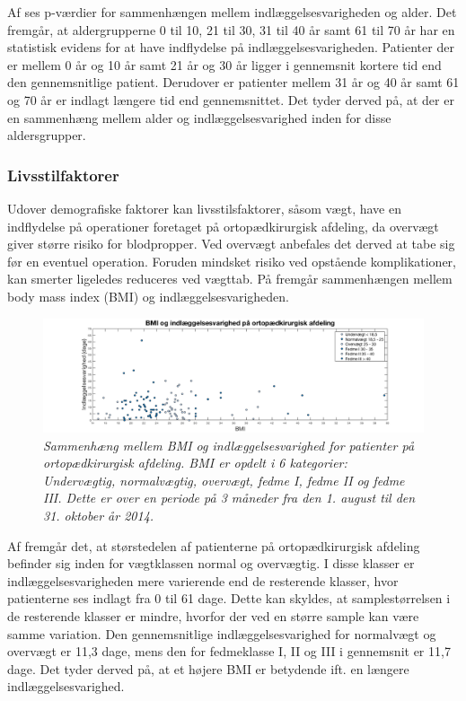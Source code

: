\noindent
Af  ses p-værdier for sammenhængen mellem indlæggelsesvarigheden og alder. Det fremgår, at aldergrupperne 0 til 10, 21 til 30, 31 til 40 år samt 61 til 70 år har en statistisk evidens for at have indflydelse på indlæggelsesvarigheden. Patienter der er mellem 0 år og 10 år samt 21 år og 30 år ligger i gennemsnit kortere tid end den gennemsnitlige patient. Derudover er patienter mellem 31 år og 40 år samt 61 og 70 år er indlagt længere tid end gennemsnittet. Det tyder derved på, at der er en sammenhæng mellem alder og indlæggelsesvarighed inden for disse aldersgrupper.


\subsubsection{Livsstilfaktorer}
Udover demografiske faktorer kan livsstilsfaktorer, såsom vægt, have en indflydelse på operationer foretaget på ortopædkirurgisk afdeling, da overvægt giver større risiko for blodpropper\cite{Ermonds2004}. Ved overvægt anbefales det derved at tabe sig før en eventuel operation. Foruden mindsket risiko ved opstående komplikationer, kan smerter ligeledes reduceres ved vægttab.\cite{Nordjylland2014} På  fremgår sammenhængen mellem body mass index (BMI) og indlæggelsesvarigheden.

\begin{figure}[H]
	\centering
	\includegraphics[scale=0.35]{figures/BMIogindlaeg}
	\caption{\textit{Sammenhæng mellem BMI og indlæggelsesvarighed for patienter på ortopædkirurgisk afdeling. BMI er opdelt i 6 kategorier: Undervægtig, normalvægtig, overvægt, fedme I, fedme II og fedme III. Dette er over en periode på 3 måneder fra den 1. august til den 31. oktober år 2014.}}
	\label{BMIogindlaeggelse}
\end{figure}

\noindent
Af  fremgår det, at størstedelen af patienterne på ortopædkirurgisk afdeling befinder sig inden for vægtklassen normal og overvægtig. I disse klasser er indlæggelsesvarigheden mere varierende end de resterende klasser, hvor patienterne ses indlagt fra 0 til 61 dage. Dette kan skyldes, at samplestørrelsen i de resterende klasser er mindre, hvorfor der ved en større sample kan være samme variation. 
Den gennemsnitlige indlæggelsesvarighed for normalvægt og overvægt er 11,3 dage, mens den for fedmeklasse I, II og III i gennemsnit er 11,7 dage. Det tyder derved på, at et højere BMI er betydende ift. en længere indlæggelsesvarighed. 


